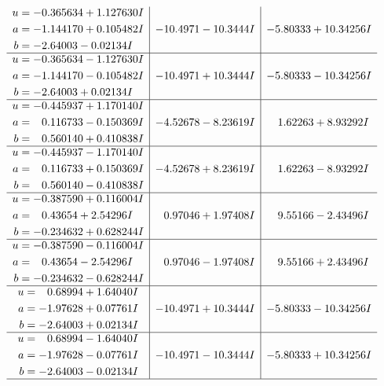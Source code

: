 \documentclass[1p]{elsarticle_modified}
\theoremstyle{definition}
\begin{document}
$$\begin{array}{c|c|c}
\begin{aligned}
u &= -0.365634 + 1.127630 I \\
a &= -1.144170 + 0.105482 I \\
b &= -2.64003 - 0.02134 I\end{aligned}
 & -10.4971 - 10.3444 I & -5.80333 + 10.34256 I \\ \hline\begin{aligned}
u &= -0.365634 - 1.127630 I \\
a &= -1.144170 - 0.105482 I \\
b &= -2.64003 + 0.02134 I\end{aligned}
 & -10.4971 + 10.3444 I & -5.80333 - 10.34256 I \\ \hline\begin{aligned}
u &= -0.445937 + 1.170140 I \\
a &= \phantom{-}0.116733 - 0.150369 I \\
b &= \phantom{-}0.560140 + 0.410838 I\end{aligned}
 & -4.52678 - 8.23619 I & \phantom{-}1.62263 + 8.93292 I \\ \hline\begin{aligned}
u &= -0.445937 - 1.170140 I \\
a &= \phantom{-}0.116733 + 0.150369 I \\
b &= \phantom{-}0.560140 - 0.410838 I\end{aligned}
 & -4.52678 + 8.23619 I & \phantom{-}1.62263 - 8.93292 I \\ \hline\begin{aligned}
u &= -0.387590 + 0.116004 I \\
a &= \phantom{-}0.43654 + 2.54296 I \\
b &= -0.234632 + 0.628244 I\end{aligned}
 & \phantom{-}0.97046 + 1.97408 I & \phantom{-}9.55166 - 2.43496 I \\ \hline\begin{aligned}
u &= -0.387590 - 0.116004 I \\
a &= \phantom{-}0.43654 - 2.54296 I \\
b &= -0.234632 - 0.628244 I\end{aligned}
 & \phantom{-}0.97046 - 1.97408 I & \phantom{-}9.55166 + 2.43496 I \\ \hline\begin{aligned}
u &= \phantom{-}0.68994 + 1.64040 I \\
a &= -1.97628 + 0.07761 I \\
b &= -2.64003 + 0.02134 I\end{aligned}
 & -10.4971 + 10.3444 I & -5.80333 - 10.34256 I \\ \hline\begin{aligned}
u &= \phantom{-}0.68994 - 1.64040 I \\
a &= -1.97628 - 0.07761 I \\
b &= -2.64003 - 0.02134 I\end{aligned}
 & -10.4971 - 10.3444 I & -5.80333 + 10.34256 I\\
 \hline 
 \end{array}$$\newpage\newpage\renewcommand{\arraystretch}{1}
\end{document}
